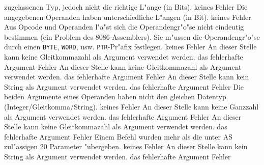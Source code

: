 \documentclass[12pt,a4paper,twoside]{report}
\newcommand{\tty}[1]{{\tt #1}}
\begin{document}
\begin{description}
{                zugelassenen Typ, jedoch nicht die richtige L"ange (in
                Bits).}
               {keines}
               {Fehler}
               {Die angegebenen Operanden haben unterschiedliche
                L"angen (in Bit).}
               {keines}
               {Fehler}
               {Aus Opcode und Operanden l"a"st sich die
                Operandengr"o"se nicht eindeutig bestimmen (ein Problem
                des 8086-Assemblers).  Sie m"ussen die Operandengr"o"se
                durch einen \tty{BYTE}, \tty{WORD}, usw. \tty{PTR}-Pr"afix
	        festlegen.}
               {keines}
               {Fehler}
               {An dieser Stelle kann keine Gleitkommazahl als Argument
                verwendet werden.}
               {das fehlerhafte Argument}
               {Fehler}
               {An dieser Stelle kann keine Gleitkommazahl als Argument
                verwendet werden.}
               {das fehlerhafte Argument}
               {Fehler}
               {An dieser Stelle kann kein String als Argument
                verwendet werden.}
               {das fehlerhafte Argument}
               {Fehler}
               {Die beiden Argumente eines Operanden haben nicht
                den gleichen Datentyp (Integer/Gleitkomma/String).}
               {keines}
               {Fehler}
               {An dieser Stelle kann keine Ganzzahl als Argument
                verwendet werden.}
               {das fehlerhafte Argument}
               {Fehler}
               {An dieser Stelle kann keine Gleitkommazahl als Argument
                verwendet werden.}
               {das fehlerhafte Argument}
               {Fehler}
               {Einem Befehl wurden mehr als die unter AS
                zul"assigen 20 Parameter "ubergeben.}
               {keines}
               {Fehler}
               {An dieser Stelle kann kein String als Argument
                verwendet werden.}
               {das fehlerhafte Argument}
               {Fehler}

\end{description}
\end{document}

